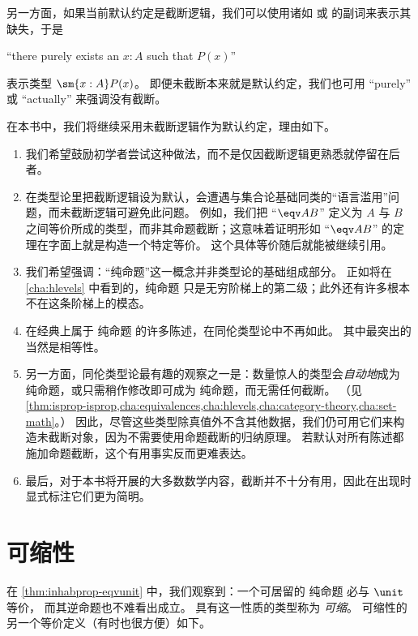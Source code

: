 另一方面，如果当前默认约定是截断逻辑，我们可以使用诸如 
%
或  的副词来表示其缺失，于是
\begin{center}
``there purely exists an $x:A$ such that $P(x)$''
\end{center}
表示类型 $\sm{x:A} P(x)$。
即便未截断本来就是默认约定，我们也可用 ``purely'' 或 ``actually'' 来强调没有截断。

在本书中，我们将继续采用未截断逻辑作为默认约定，理由如下。
\begin{enumerate}[label=(\arabic*)]
\item 我们希望鼓励初学者尝试这种做法，而不是仅因截断逻辑更熟悉就停留在后者。
\item 在类型论里把截断逻辑设为默认，会遭遇与集合论基础同类的“语言滥用”问题，而未截断逻辑可避免此问题。
  例如，我们把 ``$\eqv A B$'' 定义为 $A$ 与 $B$ 之间等价所成的类型，而非其命题截断；这意味着证明形如 ``$\eqv A B$'' 的定理在字面上就是构造一个特定等价。
  这个具体等价随后就能被继续引用。
\item 我们希望强调：“纯命题”这一概念并非类型论的基础组成部分。
  正如将在 \cref{cha:hlevels} 中看到的，纯命题 只是无穷阶梯上的第二级；此外还有许多根本不在这条阶梯上的模态。
\item 在经典上属于 纯命题 的许多陈述，在同伦类型论中不再如此。
  其中最突出的当然是相等性。
\item 另一方面，同伦类型论最有趣的观察之一是：数量惊人的类型会\emph{自动地}成为 纯命题，或只需稍作修改即可成为 纯命题，而无需任何截断。
  （见 \cref{thm:isprop-isprop,cha:equivalences,cha:hlevels,cha:category-theory,cha:set-math}。）
  因此，尽管这些类型除真值外不含其他数据，我们仍可用它们来构造未截断对象，因为不需要使用命题截断的归纳原理。
  若默认对所有陈述都施加命题截断，这个有用事实反而更难表达。
\item 最后，对于本书将开展的大多数数学内容，截断并不十分有用，因此在出现时显式标注它们更为简明。
\end{enumerate}

%
%
\section{可缩性}
\label{sec:contractibility}

%
%

在 \cref{thm:inhabprop-eqvunit} 中，我们观察到：一个可居留的 纯命题 必与 $\unit$ 等价，
%
而其逆命题也不难看出成立。
具有这一性质的类型称为 \emph{可缩}。
可缩性的另一个等价定义（有时也很方便）如下。

